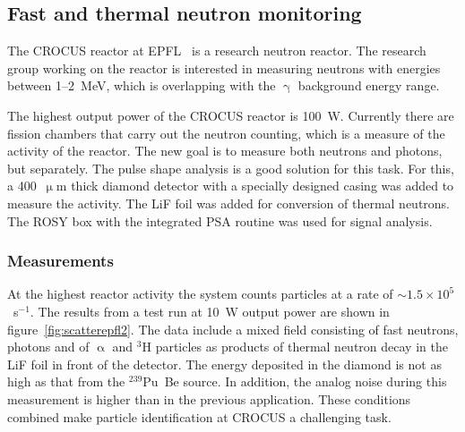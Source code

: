 






\subsection{Fast and thermal neutron monitoring}
The CROCUS reactor at EPFL~\cite{EPFL:00000} is a research neutron reactor. The research group working on the reactor is interested in measuring neutrons with energies between 1--2~MeV, which is overlapping with the $\upgamma$ background energy range.

The highest output power of the CROCUS reactor is 100~W. Currently there are fission chambers that carry out the neutron counting, which is a measure of the activity of the reactor. The new goal is to measure both neutrons and photons, but separately. The pulse shape analysis is a good solution for this task. For this, a 400~$\upmu$m thick diamond detector with a specially designed casing was added to measure the activity. The LiF foil was added for conversion of thermal neutrons. The ROSY box with the integrated PSA routine was used for signal analysis.

\subsubsection{Measurements}
At the highest reactor activity the system counts particles at a rate of $\sim1.5\times10^{5}$~s$^{-1}$. The results from a test run at 10~W output power are shown in figure~\ref{fig:scatterepfl2}. The data include a mixed field consisting of fast neutrons, photons and of $\upalpha$ and $^3$H particles as products of thermal neutron decay in the LiF foil in front of the detector. The energy deposited in the diamond is not as high as that from the $^{239}$Pu~Be source. In addition, the analog noise during this measurement is higher than in the previous application. These conditions combined make particle identification at CROCUS a challenging task.




